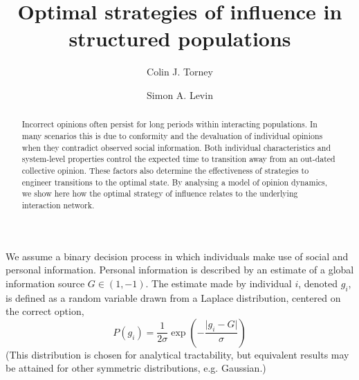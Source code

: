 \documentclass[aps,prl,twocolumn,showpacs,superscriptaddress,groupedaddress]{revtex4}
\begin{document}
\title{Optimal strategies of influence in structured populations}
\author{Colin J. Torney}
\author{Simon A. Levin}

\begin{abstract}
Incorrect opinions often persist for long periods within interacting populations. In many scenarios this is due to conformity and the devaluation of individual opinions when they contradict observed social information. Both individual characteristics and system-level properties control the expected time to transition away from an out-dated collective opinion. These factors also determine the effectiveness of strategies to engineer transitions to the optimal state. By analysing a model of opinion dynamics, we show here how the optimal strategy of influence relates to the underlying interaction network. 
\end{abstract}
\maketitle

We assume a binary decision process in which individuals make use of social and personal information. Personal information is described by an estimate of a global information source $G\in(1,-1)$. The estimate made by individual $i$, denoted $g_i$, is defined as a random variable drawn from a Laplace distribution, centered on the correct option,
\begin{equation}
P(g_i) = \frac{1}{2\sigma} \exp{ \left( - \frac{\vert g_i - G \vert}{\sigma} \right)}
\end{equation}
(This distribution is chosen for analytical tractability, but equivalent results may be attained for other symmetric distributions, e.g. Gaussian.)
\end{document}

